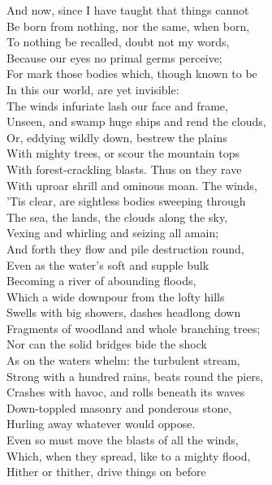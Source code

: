 And now, since I have taught that things cannot\\
Be born from nothing, nor the same, when born,\\
To nothing be recalled, doubt not my words,\\
Because our eyes no primal germs perceive;\\
For mark those bodies which, though known to be\\
In this our world, are yet invisible:\\
The winds infuriate lash our face and frame,\\
Unseen, and swamp huge ships and rend the clouds,\\
Or, eddying wildly down, bestrew the plains\\
With mighty trees, or scour the mountain tops\\
With forest-crackling blasts. Thus on they rave\\
With uproar shrill and ominous moan. The winds,\\
'Tis clear, are sightless bodies sweeping through\\
The sea, the lands, the clouds along the sky,\\
Vexing and whirling and seizing all amain;\\
And forth they flow and pile destruction round,\\
Even as the water's soft and supple bulk\\
Becoming a river of abounding floods,\\
Which a wide downpour from the lofty hills\\
Swells with big showers, dashes headlong down\\
Fragments of woodland and whole branching trees;\\
Nor can the solid bridges bide the shock\\
As on the waters whelm: the turbulent stream,\\
Strong with a hundred rains, beats round the piers,\\
Crashes with havoc, and rolls beneath its waves\\
Down-toppled masonry and ponderous stone,\\
Hurling away whatever would oppose.\\
Even so must move the blasts of all the winds,\\
Which, when they spread, like to a mighty flood,\\
Hither or thither, drive things on before\\
